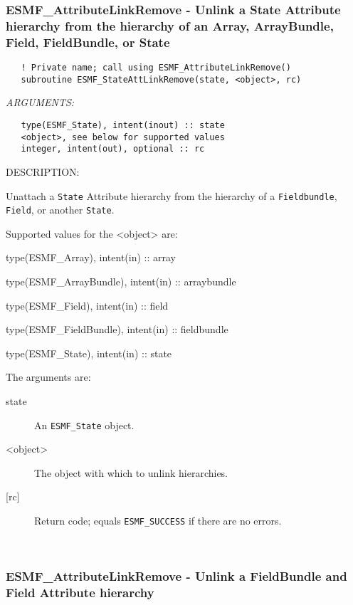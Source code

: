 \subsubsection [ESMF\_AttributeLinkRemove] {ESMF\_AttributeLinkRemove - Unlink a State Attribute hierarchy from the hierarchy of an Array, ArrayBundle, Field, FieldBundle, or State}


  
\begin{verbatim}   ! Private name; call using ESMF_AttributeLinkRemove()
   subroutine ESMF_StateAttLinkRemove(state, <object>, rc)\end{verbatim}{\em ARGUMENTS:}
\begin{verbatim}   type(ESMF_State), intent(inout) :: state
   <object>, see below for supported values
   integer, intent(out), optional :: rc\end{verbatim}
{\sf DESCRIPTION:\\ }


   Unattach a {\tt State} Attribute hierarchy from the hierarchy of
   a {\tt Fieldbundle}, {\tt Field}, or another {\tt State}.
  
   Supported values for the <object> are:
   \begin{description}
   \item type(ESMF\_Array), intent(in) :: array
   \item type(ESMF\_ArrayBundle), intent(in) :: arraybundle
   \item type(ESMF\_Field), intent(in) :: field
   \item type(ESMF\_FieldBundle), intent(in) :: fieldbundle
   \item type(ESMF\_State), intent(in) :: state
   \end{description}
  
   The arguments are:
   \begin{description}
   \item [state]
   An {\tt ESMF\_State} object.
   \item [<object>]
   The object with which to unlink hierarchies.
   \item [{[rc]}]
   Return code; equals {\tt ESMF\_SUCCESS} if there are no errors.
   \end{description}
  
   
 
\mbox{}\hrulefill\ 
 
\subsubsection [ESMF\_AttributeLinkRemove] {ESMF\_AttributeLinkRemove - Unlink a FieldBundle and Field Attribute hierarchy}


